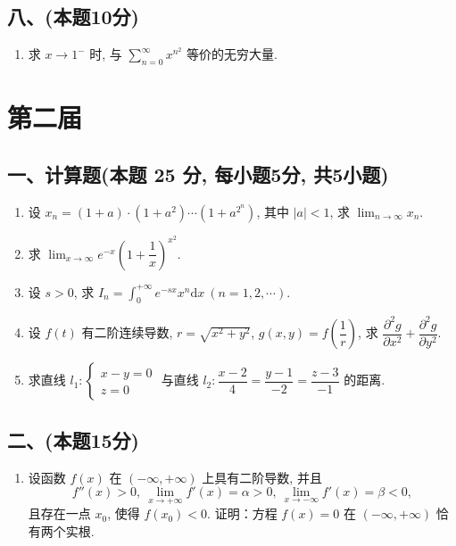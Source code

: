 \subsection*{八、(本题10分)}

\begin{enumerate}[start=11]
    \item 求 $x \to 1^-$ 时,  与 $\displaystyle\sum_{n = 0}^{\infty} x^{n^2}$ 等价的无穷大量.
\end{enumerate}

\newpage
\section{第二届}

\subsection*{一、计算题(本题 25 分,  每小题5分,  共5小题)}

\begin{enumerate}
    \item 设 $x_n = (1 + a) \cdot (1 + a^2) \cdots (1 + a^{2^n})$,  其中 $|a| < 1$,  求 $\displaystyle\lim_{n \to \infty} x_n$.
    \item 求 $\displaystyle\lim_{x \to \infty} e^{-x} \left( 1 + \dfrac{1}{x} \right)^{x^2}$.
    \item 设 $s > 0$,  求 $I_n = \displaystyle\int_0^{+\infty} e^{-sx} x^n  \mathrm{d}x \ (n = 1,  2,  \cdots)$.
    \item 设 $f(t)$ 有二阶连续导数,  $r = \sqrt{x^2 + y^2}$,  $g(x,  y) = f\left( \dfrac{1}{r} \right)$,  求 $\dfrac{\partial^2 g}{\partial x^2} + \dfrac{\partial^2 g}{\partial y^2}$.
    \item 求直线 $l_1: \begin{cases} x - y = 0 \\ z = 0 \end{cases}$ 与直线 $l_2: \dfrac{x - 2}{4} = \dfrac{y - 1}{-2} = \dfrac{z - 3}{-1}$ 的距离.
\end{enumerate}

\subsection*{二、(本题15分)}

\begin{enumerate}[start=6]
    \item 设函数 $f(x)$ 在 $(-\infty,  +\infty)$ 上具有二阶导数,  并且
          \[
              f''(x) > 0, \ \displaystyle\lim_{x \to +\infty} f'(x) = \alpha > 0, \ \displaystyle\lim_{x \to -\infty} f'(x) = \beta < 0,
          \]
          且存在一点 $x_0$,  使得 $f(x_0) < 0$. 证明：方程 $f(x) = 0$ 在 $(-\infty,  +\infty)$ 恰有两个实根.
\end{enumerate}

